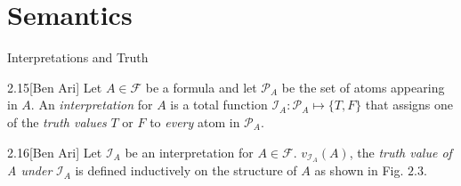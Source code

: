 \documentclass[style=sailor,size=12pt]{powerdot}
\begin{document}
\section[slide=true]{Semantics}
\begin{slide}[bm=,toc=]{Interpretations and Truth}
\begin{defn}{2.15}[Ben Ari]
Let $A \in \mathcal{F}$ be a formula and let $\mathcal{P}_A$ be the
  set of atoms appearing in $A$. An \emph{interpretation} for $A$ is a 
total function $\mathcal{I}_A: \mathcal{P}_A \mapsto \{T,F\}$ that assigns
one of the \emph{truth values} $T$ or $F$ to \emph{every} atom in
$\mathcal{P}_A$.
\end{defn}
\begin{defn}{2.16}[Ben Ari]
Let $\mathcal{I}_A$ be an interpretation for $A \in \mathcal{F}$.
$v_{\mathcal{I}_A}(A)$, the \emph{truth value of A under} $\mathcal{I}_A$
is defined inductively on the structure of $A$ as shown in Fig. $2.3$.
\end{defn}
\end{slide}
\end{document}
